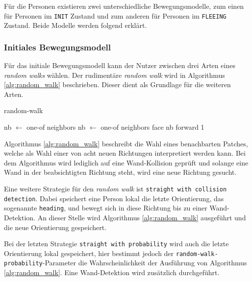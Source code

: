 Für die Personen existieren zwei unterschiedliche Bewegungsmodelle, zum einen für Personen im \verb|INIT| Zustand und zum anderen für Personen im \verb|FLEEING| Zustand. Beide Modelle werden folgend erklärt.

\subsubsection{Initiales Bewegungsmodell}
\label{sec:init_walk}


Für das initiale Bewegungsmodell kann der Nutzer zwischen drei Arten eines \emph{random walks} wählen. Der rudimentäre \emph{random walk} wird in Algorithmus \ref{alg:random_walk} beschrieben. Dieser dient als Grundlage für die weiteren Arten.


\begin{algorithm}
\caption{random-walk}
\label{alg:random_walk}
\begin{algorithmic} 
\STATE nb $\leftarrow$ one-of neighbors
\STATE nb $\leftarrow$ one-of neighbors 
\ENDWHILE
\STATE face nb
\STATE forward 1
\end{algorithmic}
\end{algorithm}

Algorithmus \ref{alg:random_walk} beschreibt die Wahl eines benachbarten Patches, welche als Wahl einer von acht neuen Richtungen interpretiert werden kann. Bei dem Algorithmus wird lediglich auf eine Wand-Kollision geprüft und solange eine Wand in der beabsichtigten Richtung steht, wird eine neue Richtung gesucht.

Eine weitere Strategie für den \emph{random walk} ist \verb|straight with collision detection|. Dabei speichert eine Person lokal die letzte Orientierung, das sogenannte \verb|heading|, und bewegt sich in diese Richtung bis zu einer Wand-Detektion. An dieser Stelle wird Algorithmus \ref{alg:random_walk} ausgeführt und die neue Orientierung gespeichert.

Bei der letzten Strategie \verb|straight with probability| wird auch die letzte Orientierung lokal gespeichert, hier bestimmt jedoch der \verb|random-walk-probability|-Parameter die Wahrscheinlichkeit der Ausführung von Algorithmus \ref{alg:random_walk}. Eine Wand-Detektion wird zusätzlich durchgeführt.

